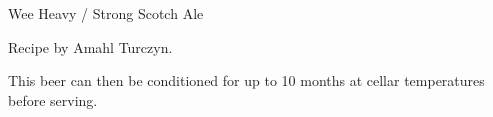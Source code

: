 \begin{recipe}{Wee Heavy / Strong Scotch Ale}

\begin{aboutblock}
Recipe by Amahl Turczyn. 
\end{aboutblock}


\begin{methodandtiming}

\begin{mashsteps}
\end{mashsteps}

\begin{fermentationsteps}
\end{fermentationsteps}

\begin{directions}
This beer can then be conditioned for up to 10 months at cellar temperatures before
serving.
\end{directions}

\end{methodandtiming}

\recipebreak

\begin{ingredientsblock}

\begin{malts}
\end{malts}

\begin{hops}
\end{hops}


\end{ingredientsblock}

\end{recipe}
